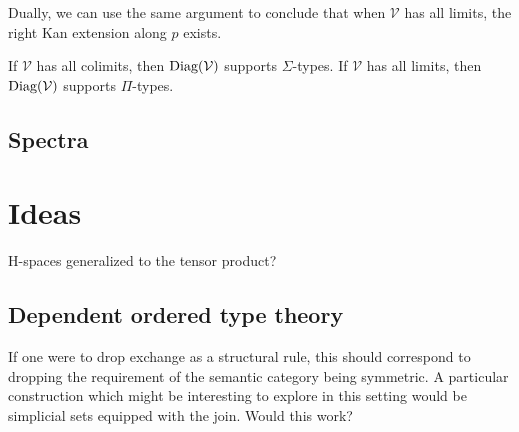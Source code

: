 Dually, we can use the same argument to conclude that when $\mathcal{V}$ has all limits, the right Kan extension along $p$ exists.
\begin{cor}
If $\mathcal{V}$ has all colimits, then $\operatorname{\text{Diag}}(\mathcal{V})$ supports $\Sigma$-types. If $\mathcal{V}$ has all limits, then $\operatorname{\text{Diag}}(\mathcal{V})$ supports $\Pi$-types.
\end{cor}
\subsection{Spectra}

\newpage


\section{Ideas}
H-spaces generalized to the tensor product?
\subsection{Dependent ordered type theory}
If one were to drop exchange as a structural rule, this should correspond to dropping the requirement of the semantic category being symmetric. A particular construction which might be interesting to explore in this setting would be simplicial sets equipped with the join. Would this work?




